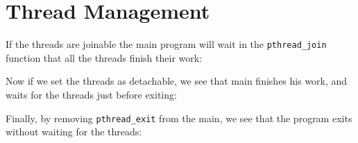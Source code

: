 \chapter{Thread Management}

If the threads are joinable the main program will wait in the \verb+pthread_join+ function that all the threads finish their work:



Now if we set the threads as detachable, we see that main finishes his work, and waits for the threads just before exiting:



Finally, by removing \verb+pthread_exit+ from the main, we see that the program exits without waiting for the threads:


